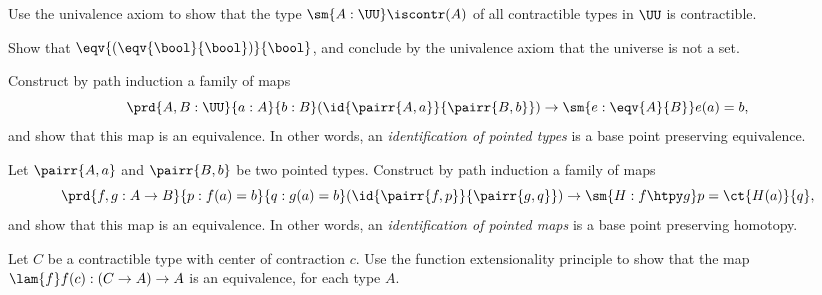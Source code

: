 \begin{exercises}
\item Use the univalence axiom to show that the type $\sm{A:\UU}\iscontr(A)$ of all contractible types in $\UU$ is contractible.
\item Show that $\eqv{(\eqv{\bool}{\bool})}{\bool}$, and conclude by the univalence axiom that the universe is not a set.
\item Construct by path induction a family of maps
\begin{equation*}
\prd{A,B:\UU}{a:A}{b:B} (\id{\pairr{A,a}}{\pairr{B,b}})\to \sm{e:\eqv{A}{B}}e(a)=b,
\end{equation*}
and show that this map is an equivalence. In other words, an \emph{identification of pointed types} is a base point preserving equivalence.
\item Let $\pairr{A,a}$ and $\pairr{B,b}$ be two pointed types. Construct by path induction a family of maps
\begin{equation*}
\prd{f,g:A\to B}{p:f(a)=b}{q:g(a)=b} (\id{\pairr{f,p}}{\pairr{g,q}})\to \sm{H:f\htpy g} p = \ct{H(a)}{q},
\end{equation*}
and show that this map is an equivalence. In other words, an \emph{identification of pointed maps} is a base point preserving homotopy.
\item Let $C$ be a contractible type with center of contraction $c$. Use the function extensionality principle to show that the map $\lam{f}f(c):(C\to A)\to A$ is an equivalence, for each type $A$.
\end{exercises}
